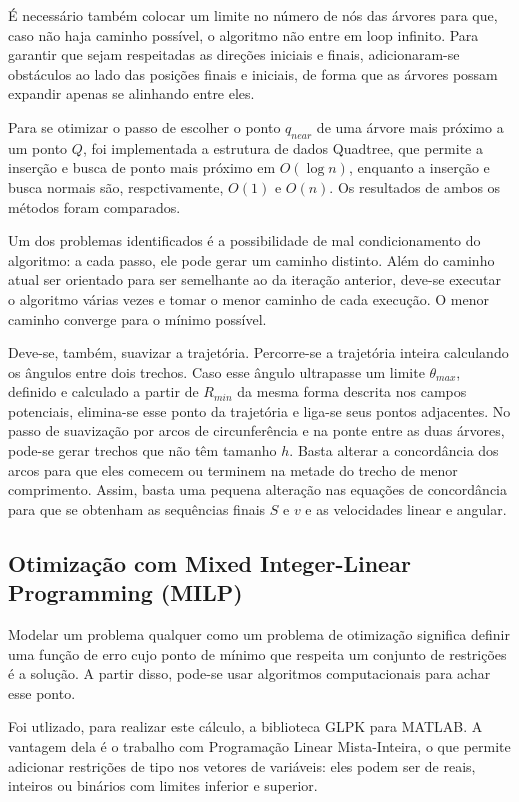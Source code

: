 \documentclass[a4paper,12pt]{article}
\begin{document}
É necessário também colocar um limite no número de nós das árvores para que, caso não haja caminho possível, o algoritmo não entre em loop infinito. Para garantir que sejam respeitadas as direções iniciais e finais, adicionaram-se obstáculos ao lado das posições finais e iniciais, de forma que as árvores possam expandir apenas se alinhando entre eles.

Para se otimizar o passo de escolher o ponto $q_{near}$ de uma árvore mais próximo a um ponto $Q$, foi implementada a estrutura de dados Quadtree, que permite a inserção e busca de ponto mais próximo em $O(\log{n})$, enquanto a inserção e busca normais são, respctivamente, $O(1)$ e $O(n)$. Os resultados de ambos os métodos foram comparados.

Um dos problemas identificados é a possibilidade de mal condicionamento do algoritmo: a cada passo, ele pode gerar um caminho distinto. Além do caminho atual ser orientado para ser semelhante ao da iteração anterior, deve-se executar o algoritmo várias vezes e tomar o menor caminho de cada execução. O menor caminho converge para o mínimo possível.

Deve-se, também, suavizar a trajetória. Percorre-se a trajetória inteira calculando os ângulos entre dois trechos. Caso esse ângulo ultrapasse um limite $\theta_{max}$, definido e calculado a partir de $R_{min}$ da mesma forma descrita nos campos potenciais, elimina-se esse ponto da trajetória e liga-se seus pontos adjacentes. No passo de suavização por arcos de circunferência e na ponte entre as duas árvores, pode-se gerar trechos que não têm tamanho $h$. Basta alterar a concordância dos arcos para que eles comecem ou terminem na metade do trecho de menor comprimento. Assim, basta uma pequena alteração nas equações de concordância para que se obtenham as sequências finais $S$ e $v$ e as velocidades linear e angular.

\subsection{Otimização com Mixed Integer-Linear Programming (MILP)}

Modelar um problema qualquer como um problema de otimização significa definir uma função de erro cujo ponto de mínimo que respeita um conjunto de restrições é a solução. A partir disso, pode-se usar algoritmos computacionais para achar esse ponto.

Foi utlizado, para realizar este cálculo, a biblioteca GLPK para MATLAB. A vantagem dela é o trabalho com Programação Linear Mista-Inteira, o que permite adicionar restrições de tipo nos vetores de variáveis: eles podem ser de reais, inteiros ou binários com limites inferior e superior.
\end{document}
